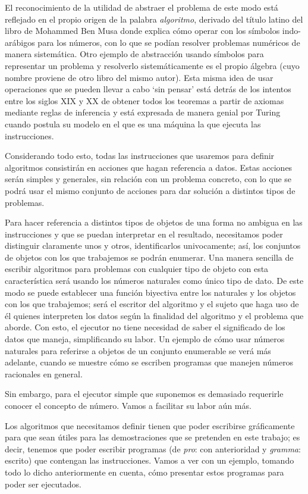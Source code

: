 El reconocimiento de la utilidad de abstraer el problema de este modo está reflejado en el propio
origen de la palabra {\it algoritmo}, derivado del título latino del libro de Mohammed Ben Musa
donde explica cómo operar con los símbolos indo-arábigos para los números, con lo que se podían
resolver problemas numéricos de manera sistemática. Otro ejemplo de abstracción usando símbolos para
representar un problema y resolverlo sistemáticamente es el propio álgebra (cuyo nombre proviene de
otro libro del mismo autor). Esta misma idea de usar operaciones que se pueden llevar a cabo ‘sin
pensar’ está detrás de los intentos entre los siglos XIX y XX de obtener todos los teoremas a partir
de axiomas mediante reglas de inferencia y está expresada de manera genial por Turing cuando postula
su modelo en el que es una máquina la que ejecuta las instrucciones.

Considerando todo esto, todas las instrucciones que usaremos para definir algoritmos consistirán en
acciones que hagan referencia a datos. Estas acciones serán simples y generales, sin relación con un
problema concreto, con lo que se podrá usar el mismo conjunto de acciones para dar solución a
distintos tipos de problemas.

Para hacer referencia a distintos tipos de objetos de una forma no ambigua en las instrucciones y
que se puedan interpretar en el resultado, necesitamos poder distinguir claramente unos y otros,
identificarlos univocamente; así, los conjuntos de objetos con los que trabajemos se podrán
enumerar. Una manera sencilla de escribir algoritmos para problemas con cualquier tipo de objeto con
esta característica será usando los números naturales como único tipo de dato. De este modo se puede
establecer una función biyectiva entre los naturales y los objetos con los que trabajemos; será el
escritor del algoritmo y el sujeto que haga uso de él quienes interpreten los datos según la
finalidad del algoritmo y el problema que aborde. Con esto, el ejecutor no tiene necesidad de saber
el significado de los datos que maneja, simplificando su labor. Un ejemplo de cómo usar números
naturales para referirse a objetos de un conjunto enumerable se verá más adelante, cuando se muestre
cómo se escriben programas que manejen números racionales en general.

Sin embargo, para el ejecutor simple que suponemos es demasiado requerirle conocer el concepto de
número. Vamos a facilitar su labor aún más.

Los algoritmos que necesitamos definir tienen que poder escribirse gráficamente para que sean útiles
para las demostraciones que se pretenden en este trabajo; es decir, tenemos que poder escribir
programas (de {\it pro}: con anterioridad y {\it gramma}: escrito) que contengan las
instrucciones. Vamos a ver con un ejemplo, tomando todo lo dicho anteriormente en cuenta, cómo
presentar estos programas para poder ser ejecutados.


